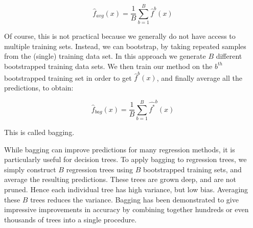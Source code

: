 $$\hat{f}_{avg}(x) = \frac{1}{B} \sum_{b=1}^{B} \hat{f}^b(x)$$

Of course, this is not practical because we generally do not have access to multiple training sets.
Instead, we can bootstrap, by taking repeated samples from the (single) training data set. In this
approach we generate $B$ different bootstrapped training data sets. We then train our method on the
$b^{th}$ bootstrapped training set in order to get $\hat{f}^b(x)$, and finally average all the
predictions, to obtain:

$$\hat{f}_{bag}(x) = \frac{1}{B} \sum_{b=1}^{B} \hat{f^*}^b(x)$$

This is called bagging.

While bagging can improve predictions for many regression methods, it is particularly useful for
decision trees. To apply bagging to regression trees, we simply construct $B$ regression trees using
$B$ bootstrapped training sets, and average the resulting predictions. These trees are grown deep,
and are not pruned. Hence each individual tree has high variance, but low bias. Averaging these $B$
trees reduces the variance. Bagging has been demonstrated to give impressive improvements in
accuracy by combining together hundreds or even thousands of trees into a single procedure.

